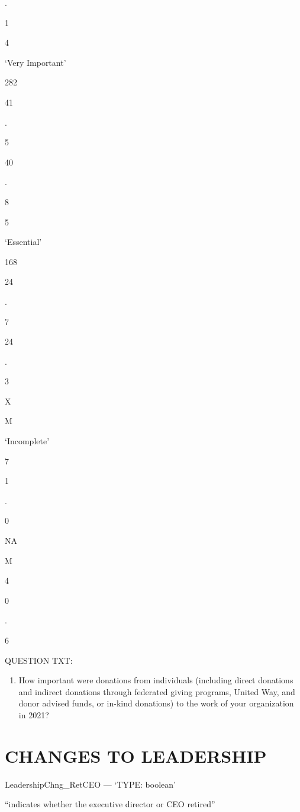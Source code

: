 \documentclass[
  letterpaper,
]{scrbook}
\providecommand{\tightlist}{%
  \setlength{\itemsep}{0pt}\setlength{\parskip}{0pt}}\usepackage{longtable,booktabs,array}
\begin{document}
\begin{enumerate}
  .

  1

  4

  `Very Important'

  282

  41

  .

  5

  40

  .

  8

  5

  `Essential'

  168

  24

  .

  7

  24

  .

  3

  X

  M

  `Incomplete'

  7

  1

  .

  0

  NA

  M

  4

  0

  .

  6

  QUESTION TXT:

  \begin{enumerate}
  \def\labelenumii{\arabic{enumii}.}
  \setcounter{enumii}{7}
  \tightlist
  \item
    How important were donations from individuals (including direct
    donations and indirect donations through federated giving programs,
    United Way, and donor advised funds, or in-kind donations) to the
    work of your organization in 2021?
  \end{enumerate}
\end{enumerate}

\chapter{CHANGES TO LEADERSHIP}\label{changes-to-leadership}

LeadershipChng\_RetCEO --- {`TYPE: boolean'}

``indicates whether the executive director or CEO retired''
\end{document}
